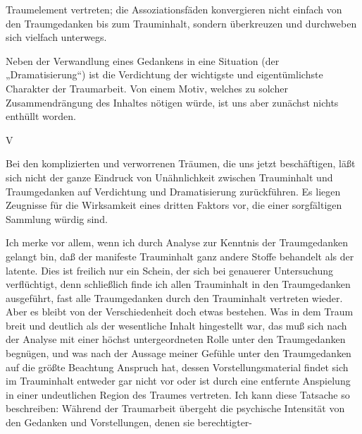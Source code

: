 \documentclass{article}
\begin{document}
        \pstart
        Traumelement vertreten; die
               Assoziationsfäden konvergieren nicht einfach von den Traumgedanken
               bis zum Trauminhalt, sondern überkreuzen und durchweben sich
               vielfach unterwegs.
        \pend
    
            
        \pstart
        Neben der Verwandlung eines Gedankens in eine Situation (der „Dramatisierung“)
               ist die Verdichtung der wichtigste und eigentümlichste Charakter der
               Traumarbeit. Von einem Motiv, welches zu solcher Zusammendrängung des Inhaltes
               nötigen würde, ist uns aber zunächst nichts enthüllt worden.
        \pend
    
         
            
            
            
        \pstart
        V
        \pend
    
            
        \pstart
        Bei den komplizierten und verworrenen Träumen, die uns jetzt beschäftigen, läßt
               sich nicht der ganze Eindruck von Unähnlichkeit zwischen Trauminhalt und
               Traumgedanken auf Verdichtung und Dramatisierung zurückführen. Es liegen Zeugnisse für die Wirksamkeit eines dritten Faktors vor, die einer
               sorgfältigen Sammlung würdig sind.
        \pend
    
            
        \pstart
        Ich merke vor allem, wenn ich durch Analyse zur Kenntnis der Traumgedanken
               gelangt bin, daß der manifeste Trauminhalt ganz andere Stoffe behandelt als der
               latente. Dies ist freilich nur ein Schein, der sich bei genauerer Untersuchung
               verflüchtigt, denn schließlich finde ich allen Trauminhalt in den Traumgedanken ausgeführt, fast alle Traumgedanken durch den Trauminhalt vertreten wieder. Aber es bleibt von der Verschiedenheit
               doch etwas bestehen. Was in dem Traum breit und deutlich als der wesentliche
               Inhalt hingestellt war, das muß sich nach der Analyse mit einer höchst
               untergeordneten Rolle unter den Traumgedanken begnügen, und was nach
               der Aussage meiner Gefühle unter den Traumgedanken auf die größte Beachtung
               Anspruch hat, dessen Vorstellungsmaterial findet sich im Trauminhalt entweder gar nicht vor oder ist durch eine entfernte Anspielung in
               einer undeutlichen Region des Traumes vertreten. Ich kann diese Tatsache so
                  beschreiben: Während der Traumarbeit übergeht die
                  psychische Intensität von den Gedanken und Vorstellungen, denen sie
                  berechtigter-
        \pend
    
\end{document}
